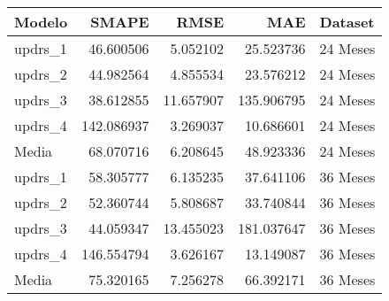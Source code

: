 \begin{tabular}{lrrrl}
\toprule
Modelo & SMAPE & RMSE & MAE & Dataset \\
\midrule
updrs_1 & 46.600506 & 5.052102 & 25.523736 & 24 Meses \\
updrs_2 & 44.982564 & 4.855534 & 23.576212 & 24 Meses \\
updrs_3 & 38.612855 & 11.657907 & 135.906795 & 24 Meses \\
updrs_4 & 142.086937 & 3.269037 & 10.686601 & 24 Meses \\
Media & 68.070716 & 6.208645 & 48.923336 & 24 Meses \\
updrs_1 & 58.305777 & 6.135235 & 37.641106 & 36 Meses \\
updrs_2 & 52.360744 & 5.808687 & 33.740844 & 36 Meses \\
updrs_3 & 44.059347 & 13.455023 & 181.037647 & 36 Meses \\
updrs_4 & 146.554794 & 3.626167 & 13.149087 & 36 Meses \\
Media & 75.320165 & 7.256278 & 66.392171 & 36 Meses \\
\bottomrule
\end{tabular}
